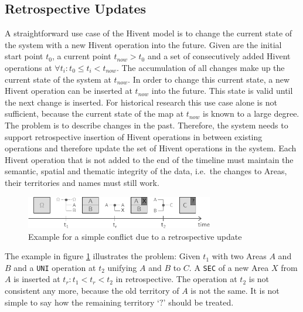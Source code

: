 
\subsection{Retrospective Updates} %
\label{sub:retrospective_updates}

A straightforward use case of the Hivent model is to change the current state of the system with a new Hivent operation into the future. Given are the initial start point $t_0$, a current point $t_{now} > t_0$ and a set of consecutively added Hivent operations at $\forall t_i: t_0 \leq t_i < t_{now}$. The accumulation of all changes make up the current state of the system at $t_{now}$. In order to change this current state, a new Hivent operation can be inserted at $t_{now}$ into the future. This state is valid until the next change is inserted. For historical research this use case alone is not sufficient, because the current state of the map at $t_{now}$ is known to a large degree. The problem is to describe changes in the past. Therefore, the system needs to support retrospective insertion of Hivent operations in between existing operations and therefore update the set of Hivent operations in the system.
Each Hivent operation that is not added to the end of the timeline must maintain the semantic, spatial and thematic integrity of the data, i.e.\ the changes to Areas, their territories and names must still work.

\begin{figure}[H]
  \vspace{1em}
  \centering
  \includegraphics[width=0.73\textwidth]{graphics/development/editing_hivent_data/retrospective_updates/example}
  \caption{Example for a simple conflict due to a retrospective update}
  \label{fig:update_conflict_example}
\end{figure}

The example in figure \ref{fig:update_conflict_example} illustrates the problem: Given $t_1$ with two Areas $A$ and $B$ and a \texttt{UNI} operation at $t_2$ unifying $A$ and $B$ to $C$. A \texttt{SEC} of a new Area $X$ from $A$ is inserted at $t_r: t_1 < t_r < t_2$ in retrospective. The operation at $t_2$ is not consistent any more, because the old territory of $A$ is not the same. It is not simple to say how the remaining territory `$?$' should be treated.


